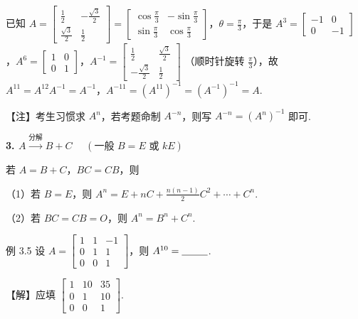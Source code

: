 

已知 $A=\begin{bmatrix}\frac12&-\frac{\sqrt3}{2}\\\frac{\sqrt3}{2}&\frac12\end{bmatrix}=\begin{bmatrix}\cos\frac{\pi}{3}&-\sin\frac{\pi}{3}\\\sin\frac{\pi}{3}&\cos\frac{\pi}{3}\end{bmatrix}$，$\theta=\frac{\pi}{3}$，于是 $A^3=\begin{bmatrix}-1&0\\0&-1\end{bmatrix}$，$A^6=\begin{bmatrix}1&0\\0&1\end{bmatrix}$，$A^{-1}=\begin{bmatrix}\frac12&\frac{\sqrt3}{2}\\-\frac{\sqrt3}{2}&\frac12\end{bmatrix}$
（顺时针旋转 $\frac{\pi}{3}$），故 $A^{11}=A^{12}A^{-1}=A^{-1}$，$A^{-11}=(A^{11})^{-1}=(A^{-1})^{-1}=A$.

\begin{fnote}
【注】考生习惯求 $A^n$，若考题命制 $A^{-n}$，则写 $A^{-n}=(A^n)^{-1}$ 即可.
\end{fnote}

\textbf{3. $A\xrightarrow{\text{分解}}B+C$} $\quad(\text{一般 }B=E\text{ 或 }kE)$

若 $A=B+C$，$BC=CB$，则

（1）若 $B=E$，则 $A^n=E+nC+\frac{n(n-1)}{2}C^2+\cdots+C^n$.

（2）若 $BC=CB=O$，则 $A^n=B^n+C^n$.

\begin{fcard}{例 3.5}
设 $A=\begin{bmatrix}1&1&-1\\0&1&1\\0&0&1\end{bmatrix}$，则 $A^{10}=\underline{\hspace{2.6em}}$.
\end{fcard}

【解】应填 $\begin{bmatrix}1&10&35\\0&1&10\\0&0&1\end{bmatrix}$.

